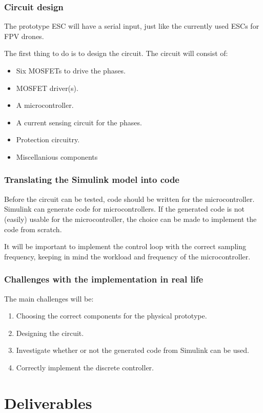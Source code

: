 \documentclass[]{report}
\begin{document}
\subsection{Circuit design}
The prototype ESC will have a serial input, just like the currently used ESCs for FPV drones.

The first thing to do is to design the circuit. The circuit will consist of:
\begin{itemize}
	\item Six MOSFETs to drive the phases.
	\item MOSFET driver(s).
	\item A microcontroller.
	\item A current sensing circuit for the phases.
	\item Protection circuitry.
	\item Miscellanious components
\end{itemize}

\subsection{Translating the Simulink model into code}
Before the circuit can be tested, code should be written for the microcontroller. Simulink can generate code for microcontrollers. If the generated code is not (easily) usable for the microcontroller, the choice can be made to implement the code from scratch.

It will be important to implement the control loop with the correct sampling frequency, keeping in mind the workload and frequency of the microcontroller.

\subsection{Challenges with the implementation in real life}
The main challenges will be:
\begin{enumerate}
	\item Choosing the correct components for the physical prototype.
	\item Designing the circuit.
	\item Investigate whether or not the generated code from Simulink can be used.
	\item Correctly implement the discrete controller.
\end{enumerate}

\chapter{Deliverables}
\end{document}
